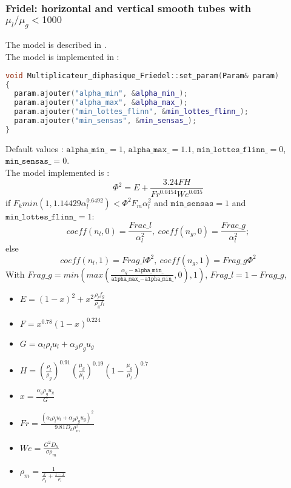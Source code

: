 \subsubsection{Fridel: horizontal and vertical smooth tubes with $\mu_l/\mu_g<1000$ }
The model is described in \cite{friedel1979improved}.\\
The model is implemented in :
\begin{lstlisting}[language=c++]
void Multiplicateur_diphasique_Friedel::set_param(Param& param)
{
  param.ajouter("alpha_min", &alpha_min_);
  param.ajouter("alpha_max", &alpha_max_);
  param.ajouter("min_lottes_flinn", &min_lottes_flinn_);
  param.ajouter("min_sensas", &min_sensas_);
}
\end{lstlisting}
Default values : $\texttt{alpha\_min\_} = 1$, $\texttt{alpha\_max\_} = 1.1$, $\texttt{min\_lottes\_flinn\_} = 0$, $\texttt{min\_sensas\_} = 0$.\\
The model implemented is :
\begin{equation}
   \Phi^2= E+\frac{3.24FH}{Fr^{0.0454}We^{0.035}} 
\end{equation}
if $F_k min(1,1.14429\alpha_l^{0.6492}) < \Phi^2 F_m \alpha_l^2$ and $\texttt{min\_sensas}=1$ and $\texttt{min\_lottes\_flinn\_}=1$: 
\begin{equation}
    coeff(n_l, 0) = \frac{Frac\_l}{\alpha_l^2},\ coeff(n_g, 0) = \frac{Frac\_g}{\alpha_l^2};
\end{equation}
else 
\begin{equation}
    coeff(n_l, 1) = Frag\_l\Phi^2,\ coeff(n_g, 1) = Frag\_g\Phi^2
\end{equation}
With $Frag\_g=min(max(\frac{\alpha_g-\texttt{alpha\_min\_}}{\texttt{alpha\_max\_}-\texttt{alpha\_min\_}},0),1)$, $Frag\_l=1-Frag\_g$,
\begin{itemize}
    \item[\small \textcolor{blue}{\ding{109}}]$E=(1-x)^2+x^2\frac{\rho_lf_g}{\rho_gf_l}$
    \item[\small \textcolor{blue}{\ding{109}}]$F=x^{0.78}(1-x)^{0.224}$
    \item[\small \textcolor{blue}{\ding{109}}]$G=\alpha_l\rho_lu_l+\alpha_g\rho_gu_g$
    \item[\small \textcolor{blue}{\ding{109}}]$H=(\frac{\rho_l}{\rho_g})^{0.91}(\frac{\mu_g}{\mu_l})^{0.19}(1-\frac{\mu_g}{\mu_l})^{0.7}$
    \item[\small \textcolor{blue}{\ding{109}}]$x=\frac{\alpha_g \rho_gu_g}{G}$
    \item[\small \textcolor{blue}{\ding{109}}]$Fr=\frac{(\alpha_l\rho_lu_l+\alpha_g \rho_gu_g)^2}{9.81D_h\rho_m^2}$
    \item[\small \textcolor{blue}{\ding{109}}]$We=\frac{G^2D_h}{\sigma \rho_m}$
    \item[\small \textcolor{blue}{\ding{109}}]$\rho_m=\frac{1}{\frac{x}{\rho_g}+\frac{1-x}{\rho_l}}$
\end{itemize}

